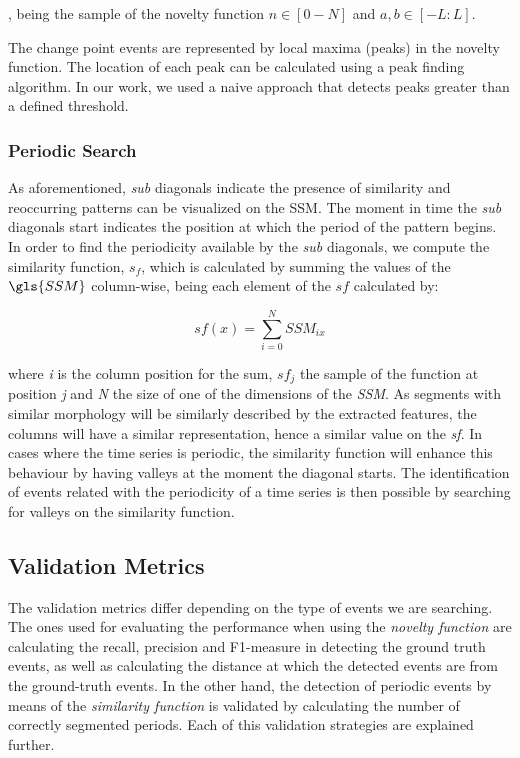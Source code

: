 , being the sample of the novelty function $n \in [0-N]$ and $a, b \in [-L:L]$.
\par
The change point events are represented by local maxima (peaks) in the novelty function. The location of each peak can be calculated using a peak finding algorithm. In our work, we used a naive approach that detects peaks greater than a defined threshold.

\subsubsection{Periodic Search}

As aforementioned, \textit{sub} diagonals indicate the presence of similarity and reoccurring patterns can be visualized on the \gls{SSM}. The moment in time the \textit{sub} diagonals start indicates the position at which the period of the pattern begins. In order to find the periodicity available by the \textit{sub} diagonals, we compute the similarity function, $s_f$, which is calculated by summing the values of the $\gls{SSM}$ column-wise, being each element of the $sf$ calculated by:

\begin{equation}
sf(x) = \sum_{i=0}^{N}{SSM_{ix}}
\end{equation}

\noindent where \textit{i} is the column position for the sum, $sf_{j}$ the sample of the function at position \textit{j} and \textit{N} the size of one of the dimensions of the \textit{\gls{SSM}}. As segments with similar morphology will be similarly described by the extracted features, the columns will have a similar representation, hence a similar value on the \textit{sf}. In cases where the time series is periodic, the similarity function will enhance this behaviour by having valleys at the moment the diagonal starts. The identification of events related with the periodicity of a time series is then possible by searching for valleys on the similarity function.   

\subsection{Validation Metrics}


The validation metrics differ depending on the type of events we are searching. The ones used for evaluating the performance when using the \textit{novelty function} are calculating the recall, precision and F1-measure in detecting the ground truth events, as well as calculating the distance at which the detected events are from the ground-truth events. In the other hand, the detection of periodic events by means of the \textit{similarity function} is validated by calculating the number of correctly segmented periods. Each of this validation strategies are explained further.

